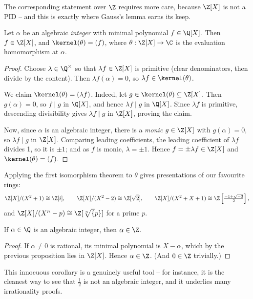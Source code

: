The corresponding statement over $\Z$ requires more care, because $\Z[X]$ is not a PID -- and this is exactly where Gauss's lemma earns its keep.

\begin{proposition}
	Let $\alpha$ be an algebraic \emph{integer} with minimal polynomial $f \in \Q[X]$. Then $f \in \Z[X]$, and $\kernel(\theta) = (f)$, where $\theta: \Z[X] \rightarrow \C$ is the evaluation homomorphism at $\alpha$.
\end{proposition}
\begin{proof}
	Choose $\lambda \in \Q^{\times}$ so that $\lambda f \in \Z[X]$ is primitive (clear denominators, then divide by the content). Then $\lambda f(\alpha) = 0$, so $\lambda f \in \kernel(\theta)$.

	We claim $\kernel(\theta) = (\lambda f)$. Indeed, let $g \in \kernel(\theta) \subseteq \Z[X]$. Then $g(\alpha) = 0$, so $f \mid g$ in $\Q[X]$, and hence $\lambda f \mid g$ in $\Q[X]$. Since $\lambda f$ is primitive, descending divisibility gives $\lambda f \mid g$ in $\Z[X]$, proving the claim.

	Now, since $\alpha$ is an algebraic integer, there is a \emph{monic} $g \in \Z[X]$ with $g(\alpha) = 0$, so $\lambda f \mid g$ in $\Z[X]$. Comparing leading coefficients, the leading coefficient of $\lambda f$ divides 1, so it is $\pm 1$; and as $f$ is monic, $\lambda = \pm 1$. Hence $f = \pm \lambda f \in \Z[X]$ and $\kernel(\theta) = (f)$.
\end{proof}

Applying the first isomorphism theorem to $\theta$ gives presentations of our favourite rings:
$$
\Z[X]/(X^2 + 1) \cong \Z[i], \qquad \Z[X]/(X^2 - 2) \cong \Z[\sqrt 2], \qquad \Z[X]/(X^2 + X + 1) \cong \Z\left[\tfrac{-1 + \sqrt{-3}}{2}\right],
$$
and $\Z[X]/(X^n - p) \cong \Z[\sqrt[n]{p}]$ for a prime $p$.

\begin{corollary}
	If $\alpha \in \Q$ is an algebraic integer, then $\alpha \in \Z$.
\end{corollary}
\begin{proof}
	If $\alpha \neq 0$ is rational, its minimal polynomial is $X - \alpha$, which by the previous proposition lies in $\Z[X]$. Hence $\alpha \in \Z$. (And $0 \in \Z$ trivially.)
\end{proof}

This innocuous corollary is a genuinely useful tool -- for instance, it is the cleanest way to see that $\frac{1}{2}$ is not an algebraic integer, and it underlies many irrationality proofs.

